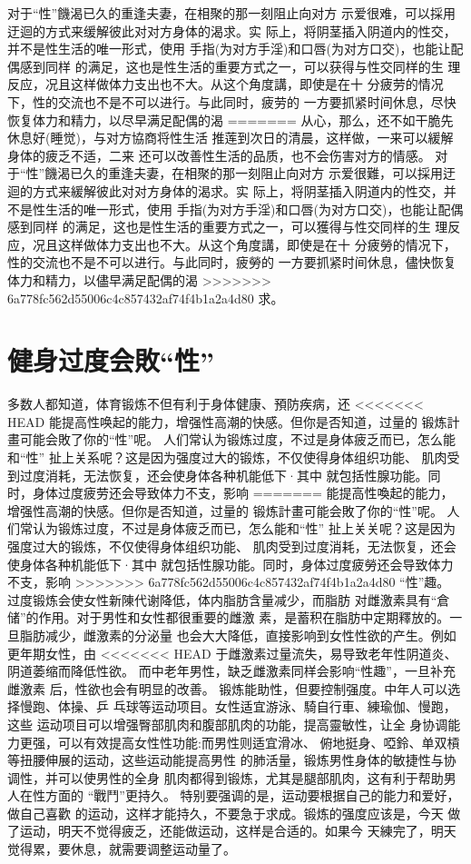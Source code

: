 \documentclass[12pt,UTF8]{ctexbook}
\begin{document}
对于“性”饑渴已久的重逢夫妻，在相聚的那一刻阻止向对方
示爱很难，可以採用迂迴的方式来缓解彼此对对方身体的渴求。实
际上，将阴茎插入阴道内的性交，并不是性生活的唯一形式，使用
手指(为对方手淫)和口唇(为对方口交)，也能让配偶感到同样
的满足，这也是性生活的重要方式之一，可以获得与性交同样的生
理反应，况且这样做体力支出也不大。从这个角度講，即使是在十
分疲劳的情况下，性的交流也不是不可以进行。与此同时，疲劳的
一方要抓紧时间休息，尽快恢复体力和精力，以尽早满足配偶的渴
=======
从心，那么，还不如干脆先休息好(睡觉)，与对方協商将性生活
推莲到次日的清晨，这样做，一来可以緩解身体的疲乏不适，二来
还可以改善性生活的品质，也不会伤害对方的情感。
对于“性”饑渴已久的重逢夫妻，在相聚的那一刻阻止向对方
示爱很難，可以採用迂迴的方式来緩解彼此对对方身体的渴求。实
际上，将阴茎插入阴道内的性交，并不是性生活的唯一形式，使用
手指(为对方手淫)和口唇(为对方口交)，也能让配偶感到同样
的满足，这也是性生活的重要方式之一，可以獲得与性交同样的生
理反应，况且这样做体力支出也不大。从这个角度講，即使是在十
分疲勞的情况下，性的交流也不是不可以进行。与此同时，疲勞的
一方要抓紧时间休息，儘快恢复体力和精力，以儘早满足配偶的渴
>>>>>>> 6a778fc562d55006c4c857432af74f4b1a2a4d80
求。

\section{健身过度会敗“性”}

多数人都知道，体育锻炼不但有利于身体健康、預防疾病，还
<<<<<<< HEAD
能提高性唤起的能力，增强性高潮的快感。但你是否知道，过量的
锻炼計畫可能会敗了你的“性”呢。
人们常认为锻炼过度，不过是身体疲乏而已，怎么能和“性”
扯上关系呢？这是因为强度过大的锻炼，不仅使得身体组织功能、
肌肉受到过度消耗，无法恢复，还会使身体各种机能低下·其中
就包括性腺功能。同时，身体过度疲劳还会导致体力不支，影响
=======
能提高性喚起的能力，增强性高潮的快感。但你是否知道，过量的
锻炼計畫可能会敗了你的“性”呢。
人们常认为锻炼过度，不过是身体疲乏而已，怎么能和“性”
扯上关关呢？这是因为强度过大的锻炼，不仅使得身体组织功能、
肌肉受到过度消耗，无法恢复，还会使身体各种机能低下·其中
就包括性腺功能。同时，身体过度疲勞还会导致体力不支，影响
>>>>>>> 6a778fc562d55006c4c857432af74f4b1a2a4d80
“性”趣。
过度锻炼会使女性新陳代谢降低，体内脂肪含量减少，而脂肪
对雌激素具有“倉储”的作用。对于男性和女性都很重要的雌激
素，是蓄积在脂肪中定期釋放的。一旦脂肪减少，雌激素的分泌量
也会大大降低，直接影响到女性性欲的产生。例如更年期女性，由
<<<<<<< HEAD
于雌激素过量流失，易导致老年性阴道炎、阴道萎缩而降低性欲。
而中老年男性，缺乏雌激素同样会影响“性趣”，一旦补充雌激素
后，性欲也会有明显的改善。
锻炼能助性，但要控制强度。中年人可以选择慢跑、体操、乒
乓球等运动项目。女性适宜游泳、騎自行車、練瑜伽、慢跑，这些
运动项目可以增强臀部肌肉和腹部肌肉的功能，提高靈敏性，让全
身协调能力更强，可以有效提高女性性功能:而男性则适宜滑冰、
俯地挺身、啞鈴、单双槓等扭腰伸展的运动，这些运动能提高男性
的肺活量，锻炼男性身体的敏捷性与协调性，并可以使男性的全身
肌肉都得到锻炼，尤其是腿部肌肉，这有利于帮助男人在性方面的
“戰鬥”更持久。
特别要强调的是，运动要根据自己的能力和爱好，做自己喜歡
的运动，这样才能持久，不要急于求成。锻炼的强度应该是，今天
做了运动，明天不觉得疲乏，还能做运动，这样是合适的。如果今
天練完了，明天觉得累，要休息，就需要调整运动量了。
\end{document}
